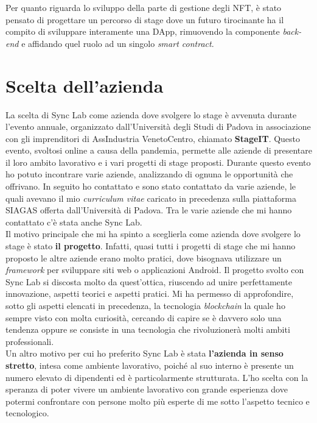Per quanto riguarda lo sviluppo della parte di gestione degli NFT, è stato pensato di progettare un percorso di stage dove un futuro tirocinante ha il compito di sviluppare interamente una \gls{DApp}, rimuovendo la componente \textit{back-end} e affidando quel ruolo ad un singolo \textit{smart contract}.


\section{Scelta dell'azienda}
La scelta di Sync Lab come azienda dove svolgere lo stage è avvenuta durante l'evento annuale, organizzato dall'Università degli Studi di Padova in associazione con gli imprenditori di AssIndustria VenetoCentro, chiamato \textbf{StageIT}. Questo evento, svoltosi online a causa della pandemia, permette alle aziende di presentare il loro ambito lavorativo e i vari progetti di stage proposti. Durante questo evento ho potuto incontrare varie aziende, analizzando di ognuna le opportunità che offrivano. In seguito ho contattato e sono stato contattato da varie aziende, le quali avevano il mio \textit{curriculum vitae} caricato in precedenza sulla piattaforma SIAGAS offerta dall'Università di Padova. Tra le varie aziende che mi hanno contattato c'è stata anche Sync Lab. \\

Il motivo principale che mi ha spinto a sceglierla come azienda dove svolgere lo stage è stato \textbf{il progetto}. Infatti, quasi tutti i progetti di stage che mi hanno proposto le altre aziende erano molto pratici, dove bisognava utilizzare un \textit{framework} per sviluppare siti web o applicazioni Android. Il progetto svolto con Sync Lab si discosta molto da quest'ottica, riuscendo ad unire perfettamente innovazione, aspetti teorici e aspetti pratici. Mi ha permesso di approfondire, sotto gli aspetti elencati in precedenza, la tecnologia \textit{blockchain} la quale ho sempre visto con molta curiosità, cercando di capire se è davvero solo una tendenza oppure se consiste in una tecnologia che rivoluzionerà molti ambiti professionali. \\

Un altro motivo per cui ho preferito Sync Lab è stata \textbf{l'azienda in senso stretto}, intesa come ambiente lavorativo, poiché al suo interno è presente un numero elevato di dipendenti ed è particolarmente strutturata. L'ho scelta con la speranza di poter vivere un ambiente lavorativo con grande esperienza dove potermi confrontare con persone molto più esperte di me sotto l'aspetto tecnico e tecnologico.

